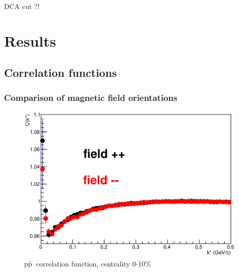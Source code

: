 \documentclass[ALICE,manyauthors]{ALICE_analysis_notes}
\newcommand{\pap}{$\rm p\bar{\rm p}$}
\newcommand{\pal}{$\rm p\bar{\rm \Lambda}$}
\newcommand{\apl}{$\bar{\rm p }\Lambda$}
\begin{document}



DCA cut ?!

\section{Results}

\subsection{Correlation functions}

\subsubsection{Comparison of magnetic field orientations}

\begin{figure}[]
   \centering
   \includegraphics[width=0.99\textwidth]{pics/compPAP}
   \caption{ \pap~correlation function, centrality 0-10$\%$}
   \label{fig:papCorrFun}
 \end{figure}
\end{document}
